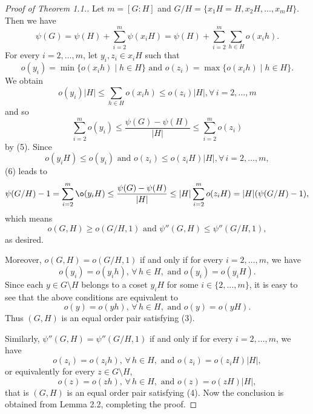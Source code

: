 \documentclass[12pt]{article}
\newcommand{\dd}{\displaystyle }
\newcommand{\0}{{\leqno}}
\begin{document}
\begin{proof}[Proof of Theorem 1.1.] 
Let $m=[G:H]$ and $G/H=\{x_1H=H,x_2H,\dots,x_mH\}$. Then we have
\begin{equation}
\psi(G)=\psi(H)+\dd\sum_{i=2}^m\psi(x_iH)=\psi(H)+\dd\sum_{i=2}^m\dd\sum_{h\in H}o(x_ih).
\end{equation}For every $i=2,\dots,m$, let $y_i,z_i\in x_iH$ such that
\begin{equation}
o(y_i)=\min\{o(x_ih)\mid h\in H\} \mbox{ and } o(z_i)=\max\{o(x_ih)\mid h\in H\}.\nonumber
\end{equation}We obtain
\begin{equation}
o(y_i)|H|\leq\dd\sum_{h\in H}o(x_ih)\leq o(z_i)|H|, \forall\, i=2,\dots,m\nonumber
\end{equation}and so
\begin{equation}
\dd\sum_{i=2}^mo(y_i)\leq\dd\frac{\psi(G)-\psi(H)}{|H|}\leq\dd\sum_{i=2}^mo(z_i)
\end{equation}by (5). Since 
\begin{equation}
o(y_iH)\leq o(y_i) \mbox{ and } o(z_i)\leq o(z_iH)|H|, \forall\, i=2,\dots,m,\nonumber
\end{equation}(6) leads to
\begin{equation}
\psi(G/H)-1=\sum_{i=2}^m\o(y_iH)\leq\dd\frac{\psi(G)-\psi(H)}{|H|}\leq|H|\sum_{i=2}^mo(z_iH)=|H|(\psi(G/H)-1),\nonumber
\end{equation}which means
\begin{equation}
o(G,H)\geq o(G/H,1) \mbox{ and } \psi''(G,H)\leq\psi''(G/H,1),\nonumber
\end{equation}as desired.

Moreover, $o(G,H)=o(G/H,1)$ if and only if for every $i=2,\dots,m$, we have
\begin{equation}
o(y_i)=o(y_ih),\, \forall\, h\in H, \mbox{ and } o(y_i)=o(y_iH).\nonumber
\end{equation}Since each $y\in G\setminus H$ belongs to a coset $y_iH$ for some $i\in\{2,\dots,m\}$, it is easy to see that the above conditions are equivalent to
\begin{equation}
o(y)=o(yh),\, \forall\, h\in H, \mbox{ and } o(y)=o(yH).\nonumber
\end{equation}Thus $(G,H)$ is an equal order pair satisfying (3).

Similarly, $\psi''(G,H)=\psi''(G/H,1)$ if and only if for every $i=2,\dots,m$, we have
\begin{equation}
o(z_i)=o(z_ih),\, \forall\, h\in H, \mbox{ and } o(z_i)=o(z_iH)|H|,\nonumber
\end{equation}or equivalently for every $z\in G\setminus H$,
\begin{equation}
o(z)=o(zh),\, \forall\, h\in H, \mbox{ and } o(z)=o(zH)|H|,\nonumber
\end{equation}that is $(G,H)$ is an equal order pair satisfying (4). Now the conclusion is obtained from Lemma 2.2, completing the proof.
\end{proof}
\end{document}
